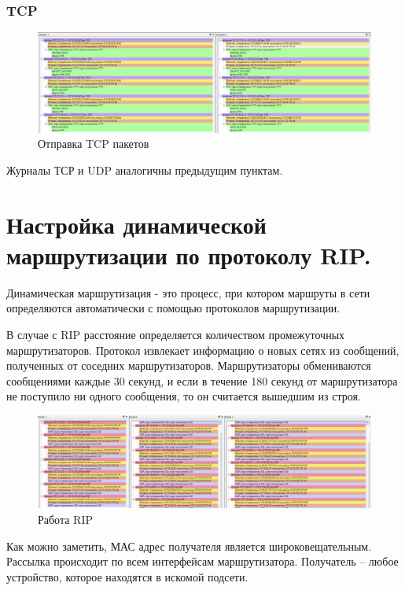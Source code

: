 \documentclass[12pt,onecolumn]{article}
\begin{document}
\subsubsection{TCP}
\begin{figure}[H]
    \centering
    \includegraphics[width=\textwidth]{image/part-3/tcp.png}
    \caption{Отправка TCP пакетов}
\end{figure}

Журналы ТСР и UDP аналогичны предыдущим пунктам.

\section{Настройка динамической маршрутизации по протоколу RIP.}

Динамическая маршрутизация - это процесс, при котором маршруты в сети определяются автоматически с помощью протоколов маршрутизации. 

В случае с RIP расстояние определяется количеством промежуточных маршрутизаторов. Протокол извлекает информацию о новых сетях из сообщений, полученных от соседних маршрутизаторов. Маршрутизаторы обмениваются сообщениями каждые 30 секунд, и если в течение 180 секунд от маршрутизатора не поступило ни одного сообщения, то он считается вышедшим из строя.


\begin{figure}[H]
    \centering
    \includegraphics[width=\textwidth]{image/part-4/RIP.png}
    \caption{Работа RIP}
\end{figure}
Как можно заметить, МАС адрес получателя является широковещательным.
Рассылка происходит по всем интерфейсам маршрутизатора.
Получатель -- любое устройство, которое находятся в искомой подсети.
\end{document}
